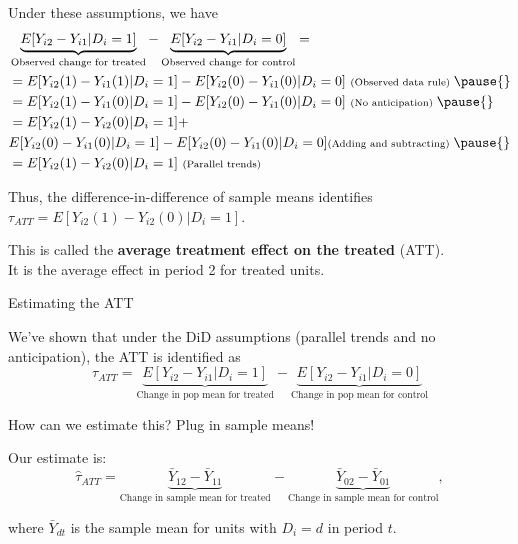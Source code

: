 \documentclass[11pt,english,handout]{beamer}
\newenvironment{wideitemize}{\itemize\addtolength{\itemsep}{10pt}}{\enditemize}
\begin{document}
\begin{frame}
\begin{wideitemize}
	\item 
	Under these assumptions, we have
	\begin{align*}
	& \underbrace{E[Y_{i2} - Y_{i1} | D_i = 1 ]}_{\text{Observed change for treated}} - \underbrace{E[Y_{i2} - Y_{i1} | D_i = 0 ]}_{\text{Observed change for control}} = \\
	&= E[Y_{i2}(1) - Y_{i1}(1) | D_i = 1 ] - E[Y_{i2}(0) - Y_{i1}(0) | D_i = 0 ] \text{ \scriptsize (Observed data rule) } \pause{}\\
	&= E[Y_{i2}(1) - Y_{i1}(0) | D_i = 1 ] - E[Y_{i2}(0) - Y_{i1}(0) | D_i = 0 ] \text{ \scriptsize (No anticipation) } \pause{} \\
	&  = E[Y_{i2}(1) - Y_{i2}(0) | D_i = 1] + \\&  E[Y_{i2}(0) - Y_{i1}(0) | D_i = 1 ] - E[Y_{i2}(0) - Y_{i1}(0) | D_i = 0 ]  \text{\scriptsize  (Adding and subtracting) } \pause{}\\
	&= E[Y_{i2}(1) - Y_{i2}(0) | D_i = 1] \text{ \scriptsize(Parallel trends) }
	\end{align*}

	\pause
	\item
	Thus, the difference-in-difference of sample means identifies $\tau_{ATT} = E[Y_{i2}(1)- Y_{i2}(0) | D_i = 1]$.
	
	\item
	This is called the \textbf{average treatment effect on the treated} (ATT).\\
	It is the average effect in period 2 for treated units.
	
\end{wideitemize}
\end{frame}
	
	
\begin{frame}{Estimating the ATT}
	\begin{wideitemize}
		\item
		We've shown that under the DiD assumptions (parallel trends and no anticipation), the ATT is identified as
		$$ \tau_{ATT} = \underbrace{E[Y_{i2} - Y_{i1} | D_i = 1 ]}_{\text{Change in pop mean for treated}} - \underbrace{E[Y_{i2} - Y_{i1} | D_i = 0 ]}_{\text{Change in pop mean for control}}  $$
		
		\item
		How can we estimate this? \pause{} Plug in sample means!
		
		\pause
		\item
		Our estimate is: 
		$$\hat\tau_{ATT} = \underbrace{\bar{Y}_{12} - \bar{Y}_{11} }_{\text{Change in sample mean for treated}} - \underbrace{\bar{Y}_{02} - \bar{Y}_{01}}_{\text{Change in sample mean for control}} , $$
		
		\noindent where $\bar{Y}_{dt}$ is the sample mean for units with $D_i =d $ in period $t$. 
		
	\end{wideitemize}
\end{frame}	
\end{document}
